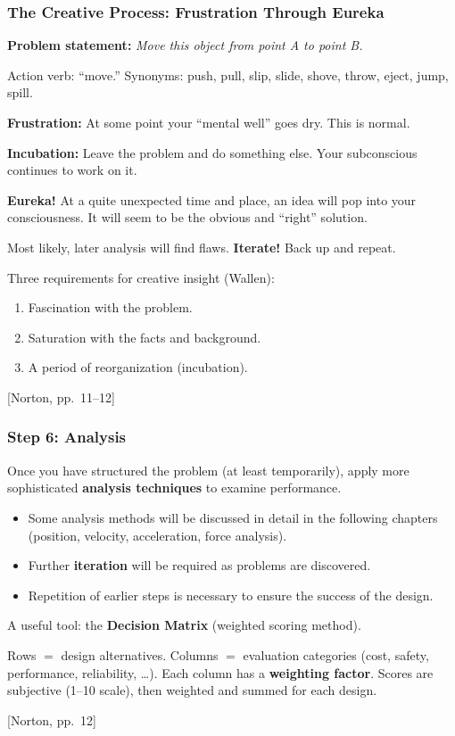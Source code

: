 \documentclass[10pt,aspectratio=43]{beamer}
\newcommand{\pref}[1]{\vfill\hfill{\scriptsize\color{gray}[Norton, pp.~#1]}}
\begin{document}
\begin{frame}
\frametitle{The Creative Process: Frustration Through Eureka}

\textbf{Problem statement:} \emph{Move this object from point A to point B.}

Action verb: ``move.'' Synonyms: push, pull, slip, slide, shove, throw, eject, jump, spill.

\vspace{6pt}
\textbf{Frustration:} At some point your ``mental well'' goes dry. This is normal.

\vspace{4pt}
\textbf{Incubation:} Leave the problem and do something else. Your subconscious continues to work on it.

\begin{redbox}
\textbf{Eureka!} At a quite unexpected time and place, an idea will pop into your consciousness. It will seem to be the obvious and ``right'' solution.

Most likely, later analysis will find flaws. \textbf{Iterate!} Back up and repeat.
\end{redbox}

\vspace{4pt}
Three requirements for creative insight (Wallen):
\begin{enumerate}
  \item Fascination with the problem.
  \item Saturation with the facts and background.
  \item A period of reorganization (incubation).
\end{enumerate}
\pref{11--12}
\end{frame}

\begin{frame}
\frametitle{Step 6: Analysis}

Once you have structured the problem (at least temporarily), apply more sophisticated \textbf{analysis techniques} to examine performance.

\vspace{6pt}
\begin{itemize}
  \item Some analysis methods will be discussed in detail in the following chapters (position, velocity, acceleration, force analysis).
  \item Further \textbf{iteration} will be required as problems are discovered.
  \item Repetition of earlier steps is necessary to ensure the success of the design.
\end{itemize}

\vspace{6pt}
A useful tool: the \textbf{Decision Matrix} (weighted scoring method).

\vspace{4pt}
\begin{yellowbox}
Rows $=$ design alternatives. Columns $=$ evaluation categories (cost, safety, performance, reliability, \ldots). Each column has a \textbf{weighting factor}. Scores are subjective (1--10 scale), then weighted and summed for each design.
\end{yellowbox}
\pref{12}
\end{frame}
\end{document}
